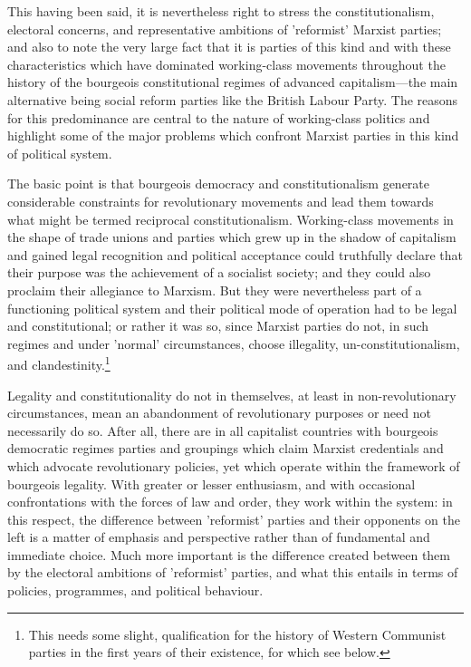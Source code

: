 This having been said, it is nevertheless right to stress the constitutionalism, electoral concerns, and representative ambitions of 'reformist' Marxist parties; and also to note the very large fact that it is parties of this kind and with these characteristics which have dominated working-class movements throughout the history of the bourgeois constitutional regimes of advanced capitalism—the main alternative being social reform parties like the British Labour Party. The reasons for this predominance are central to the nature of working-class politics and highlight some of the major problems which confront Marxist parties in this kind of political system.

The basic point is that bourgeois democracy and constitutionalism generate considerable constraints for revolutionary movements and lead them towards what might be termed reciprocal constitutionalism. Working-class movements in the shape of trade unions and parties which grew up in the shadow of capitalism and gained legal recognition and political acceptance could truthfully declare that their purpose was the achievement of a socialist society; and they could also proclaim their allegiance to Marxism. But they were nevertheless part of a functioning political system and their political mode of operation had to be legal and constitutional; or rather it was so, since Marxist parties do not, in such regimes and under 'normal' circumstances, choose illegality, un\hyp{}constitutionalism, and clandestinity.\footnote{This needs some slight, qualification for the history of Western Communist parties in the first years of their existence, for which see below.}

Legality and constitutionality do not in themselves, at least in non-revolutionary circumstances, mean an abandonment of revolutionary purposes or need not necessarily do so. After all, there are in all capitalist countries with bourgeois democratic regimes parties and groupings which claim Marxist credentials and which advocate revolutionary policies, yet which operate within the framework of bourgeois legality. With greater or lesser enthusiasm, and with occasional confrontations with the forces of law and order, they work within the system: in this respect, the difference between 'reformist' parties and their opponents on the left is a matter of emphasis and perspective rather than of fundamental and immediate choice. Much more important is the difference created between them by the electoral ambitions of 'reformist' parties, and what this entails in terms of policies, programmes, and political behaviour.

